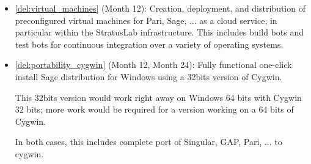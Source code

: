 \begin{Workpackage}{\thewpno}
\begin{WPDeliverables}
\begin{itemize}
    \item \ref{del:virtual_machines} (Month 12): Creation, deployment, and
      distribution of preconfigured virtual machines for Pari, Sage,
      ... as a cloud service, in particular within the StratusLab
      infrastructure. This includes build bots and test bots for
      continuous integration over a variety of operating systems.

    \item \ref{del:portability_cygwin} (Month 12, Month 24): Fully
      functional one-click install Sage distribution for Windows using a
      32bits version of Cygwin.

      This 32bits version would work right away on Windows 64 bits with
      Cygwin 32 bits; more work would be required for a version working on
      a 64 bits of Cygwin.

      In both cases, this includes complete port of Singular, GAP, Pari,
      ...  to cygwin.




\end{itemize}
\end{WPDeliverables}
\end{Workpackage}
